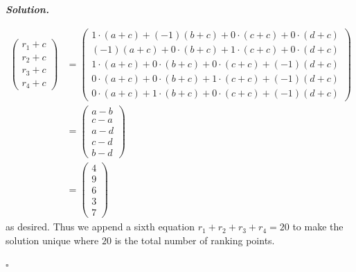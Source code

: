 \documentclass[12pt]{report}
\newenvironment{solution}[1][\it{Solution}]{\textbf{#1. } }{$\square$}
\begin{document}
\begin{solution}
\begin{enumerate}
\begin{align*}
\begin{pmatrix}
                r_1+c\\r_2+c\\r_3+c\\r_4+c
            \end{pmatrix} &= \begin{pmatrix}1\cdot \left(a+c\right)+\left(-1\right)\left(b+c\right)+0\cdot \left(c+c\right)+0\cdot \left(d+c\right)\\ \left(-1\right)\left(a+c\right)+0\cdot \left(b+c\right)+1\cdot \left(c+c\right)+0\cdot \left(d+c\right)\\ 1\cdot \left(a+c\right)+0\cdot \left(b+c\right)+0\cdot \left(c+c\right)+\left(-1\right)\left(d+c\right)\\ 0\cdot \left(a+c\right)+0\cdot \left(b+c\right)+1\cdot \left(c+c\right)+\left(-1\right)\left(d+c\right)\\ 0\cdot \left(a+c\right)+1\cdot \left(b+c\right)+0\cdot \left(c+c\right)+\left(-1\right)\left(d+c\right)\end{pmatrix}\\ &= \begin{pmatrix}a-b\\ c-a\\ a-d\\ c-d\\ b-d\end{pmatrix}\\
            &=\begin{pmatrix}
                4\\9\\6\\3\\7
            \end{pmatrix}      
        \end{align*} 
        as desired. Thus we append a sixth equation $r_1 + r_2 + r_3 + r_4 = 20$ to make the solution unique where $20$ is the total number of ranking points. 


\end{enumerate}
\end{solution}
\end{document}

